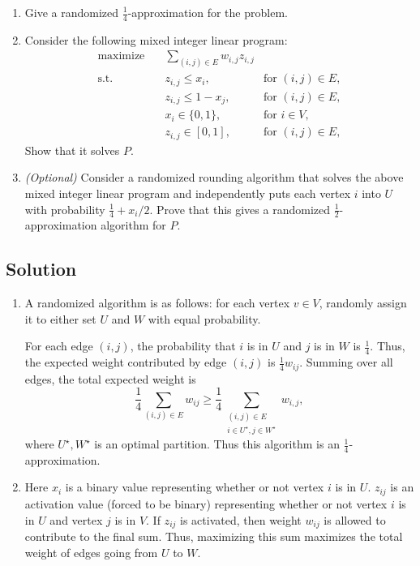 \documentclass[14pt]{extreport}
\begin{document}
    \begin{enumerate}
        \item Give a randomized \(\frac{1}{4}\)-approximation for the problem.
        
        \item Consider the following mixed integer linear program:
        \begin{align*}
        \text{maximize} \quad & \sum_{(i,j) \in E} w_{i,j}z_{i,j} \\
        \text{s.t.} \quad & z_{i,j} \leq x_i, & \text{for } (i, j) \in E, \\
        & z_{i,j} \leq 1 - x_j, & \text{for } (i, j) \in E, \\
        & x_i \in \{0, 1\}, & \text{for } i \in V, \\
        & z_{i,j} \in [0, 1], & \text{for } (i, j) \in E,
        \end{align*}
        Show that it solves \( P \).
        \item \textit{(Optional)} Consider a randomized rounding algorithm that solves the above mixed integer linear program and independently puts each vertex \( i \) into \( U \) with probability \(\frac{1}{4}+x_i/2\). Prove that this gives a randomized \( \frac{1}{2} \)-approximation algorithm for \( P \).
    \end{enumerate}

\subsection*{Solution}
    \begin{enumerate}
        \item A randomized algorithm is as follows: for each vertex $v \in V$, randomly assign it to either set $U$ and $W$ with equal probability.
        
        \vspace{3mm}
        For each edge \( (i, j) \), the probability that \( i \) is in \( U \) and \( j \) is in \( W \) is $\frac{1}{4}$. Thus, the expected weight contributed by edge \( (i, j) \) is \( \frac{1}{4} w_{ij} \). Summing over all edges, the total expected weight is  $$\frac{1}{4} \sum_{(i,j) \in E} w_{ij} \ge \frac{1}{4} \sum_{\substack{(i,j) \in E \\ i \in U^{\star},j \in W^{\star}}} w_{i,j},$$ where $U^{\star}, W^{\star}$ is an optimal partition. Thus this algorithm is an \(\frac{1}{4}\)-approximation.
        \item Here $x_{i}$ is a binary value representing whether or not vertex $i$ is in $U$. $z_{ij}$ is an activation value (forced to be binary) representing whether or not vertex $i$ is in $U$ and vertex $j$ is in $V$. If $z_{ij}$ is activated, then weight $w_{ij}$ is allowed to contribute to the final sum. Thus, maximizing this sum maximizes the total weight of edges going from $U$ to $W$.
    \end{enumerate}
\end{document}
